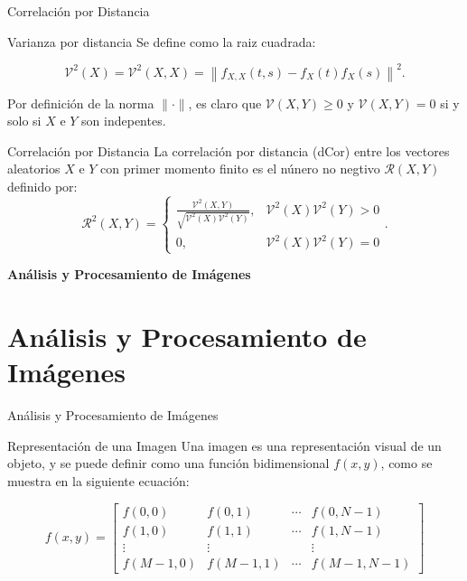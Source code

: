 \documentclass{beamer}
\begin{document}
\begin{frame}{Correlaci\'on por Distancia}
    \begin{block}{Varianza por distancia}
        Se define como la raiz cuadrada:

        $$
        \mathcal{V}^2(X)=\mathcal{V}^2(X, X)=\left\|f_{X, X}(t, s)-f_X(t) f_X(s)\right\|^2 .
        $$
    
        Por definici\'on de la norma $\|\cdot\|$, es claro que  $\mathcal{V}(X, Y) \geq 0$ y $\mathcal{V}(X, Y)=0$ si y solo si $X$ e $Y$ son indepentes.
        
    \end{block}
    \begin{block}{Correlaci\'on por Distancia}
        La correlaci\'on por distancia (dCor) entre los vectores aleatorios $X$ e $Y$ con primer momento finito es el n\'unero no negtivo $\mathcal{R}(X, Y)$ definido por:
		$$
		\mathcal{R}^2(X, Y)= \begin{cases}\frac{\mathcal{V}^2(X, Y)}{\sqrt{\mathcal{V}^2(X) \mathcal{V}^2(Y)}}, & \mathcal{V}^2(X) \mathcal{V}^2(Y)>0 \\ 0, & \mathcal{V}^2(X) \mathcal{V}^2(Y)=0\end{cases}.
		$$
    \end{block}
\end{frame}

\begin{frame}
    \begin{center}
        {\LARGE\bf Análisis y Procesamiento de Imágenes}
    \end{center}
\end{frame}

\section{Análisis y Procesamiento de Imágenes}
\begin{frame}{Análisis y Procesamiento de Imágenes}
     
    \begin{block}{Representación de una Imagen}
        Una imagen es una representaci\'on visual de un objeto, y se puede definir como una funci\'on bidimensional $f(x,y)$, como se muestra en la siguiente ecuaci\'on:

        $$
        f(x, y)=\left[\begin{array}{cccc}
        f(0,0) & f(0,1) & \cdots & f(0, N-1) \\
        f(1,0) & f(1,1) & \cdots & f(1, N-1) \\
        \vdots & \vdots & & \vdots \\
        f(M-1,0) & f(M-1,1) & \cdots & f(M-1, N-1)
        \end{array}\right]
        $$
    \end{block}
\end{frame}
\end{document}
